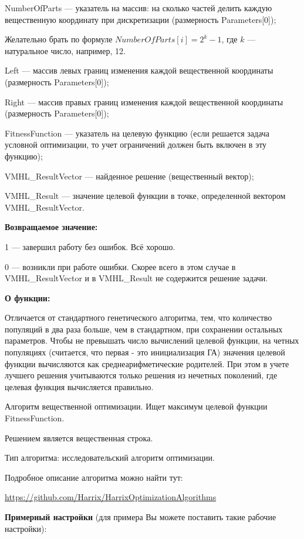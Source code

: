 \documentclass[a4paper,12pt]{article}
\begin{document}
 NumberOfParts --- указатель на массив: на сколько частей делить каждую вещественную координату при дискретизации (размерность Parameters[0]);
 
  Желательно брать по формуле $NumberOfParts[i]=2^k-1$, где $k$ --- натуральное число, например, 12.
  
 Left --- массив левых границ изменения каждой вещественной координаты (размерность Parameters[0]);
 
 Right --- массив правых границ изменения каждой вещественной координаты (размерность Parameters[0]);
 
 FitnessFunction --- указатель на целевую функцию (если решается задача условной оптимизации, то учет ограничений должен быть включен в эту функцию);
 
 VMHL\_ResultVector --- найденное решение (вещественный вектор);
 
 VMHL\_Result --- значение целевой функции в точке, определенной вектором VMHL\_ResultVector.

\textbf{Возвращаемое значение:} 

 1 --- завершил работу без ошибок. Всё хорошо.
 
 0 --- возникли при работе ошибки. Скорее всего в этом случае в VMHL\_ResultVector и в VMHL\_Result не содержится решение задачи.

\textbf{О функции:}

Отличается от стандартного генетического алгоритма, тем, что количество популяций в два раза больше, чем в стандартном, при сохранении остальных параметров. Чтобы не превышать число вычислений целевой функции, на четных популяциях (считается, что первая - это инициализация ГА) значения целевой функции вычисляются как среднеарифметические родителей. При этом в учете лучшего решения учитываются только решения из нечетных поколений, где целевая функция вычисляется правильно.

Алгоритм вещественной оптимизации. Ищет максимум целевой функции FitnessFunction.

Решением является вещественная строка.

Тип алгоритма: исследовательский алгоритм оптимизации.

Подробное описание алгоритма можно найти тут:

\href{https://github.com/Harrix/HarrixOptimizationAlgorithms/blob/master/\_HarrixOptimizationAlgorithms.pdf}{https://github.com/Harrix/HarrixOptimizationAlgorithms}

\textbf{Примерный настройки} (для примера Вы можете поставить такие рабочие настройки):
\end{document}
